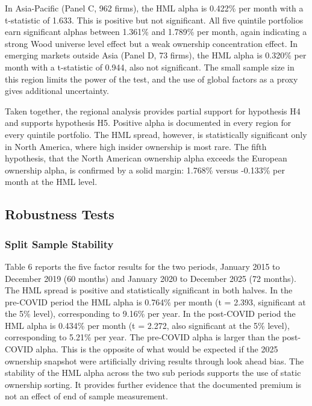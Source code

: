 In Asia-Pacific (Panel C, 962 firms), the HML alpha is 0.422\% per month with a t-statistic of 1.633. This is positive but not significant. All five quintile portfolios earn significant alphas between 1.361\% and 1.789\% per month, again indicating a strong Wood universe level effect but a weak ownership concentration effect. In emerging markets outside Asia (Panel D, 73 firms), the HML alpha is 0.320\% per month with a t-statistic of 0.944, also not significant. The small sample size in this region limits the power of the test, and the use of global factors as a proxy gives additional uncertainty.



Taken together, the regional analysis provides partial support for hypothesis H4 and supports hypothesis H5. Positive alpha is documented in every region for every quintile portfolio. The HML spread, however, is statistically significant only in North America, where high insider ownership is most rare. The fifth hypothesis, that the North American ownership alpha exceeds the European ownership alpha, is confirmed by a solid margin: 1.768\% versus -0.133\% per month at the HML level.


\subsection{Robustness Tests}


\subsubsection{Split Sample Stability}

Table 6 reports the five factor results for the two periods, January 2015 to December 2019 (60 months) and January 2020 to December 2025 (72 months). The HML spread is positive and statistically significant in both halves. In the pre-COVID period the HML alpha is 0.764\% per month (t = 2.393, significant at the 5\% level), corresponding to 9.16\% per year. In the post-COVID period the HML alpha is 0.434\% per month (t = 2.272, also significant at the 5\% level), corresponding to 5.21\% per year. The pre-COVID alpha is larger than the post-COVID alpha. This is the opposite of what would be expected if the 2025 ownership snapshot were artificially driving results through look ahead bias. The stability of the HML alpha across the two sub periods supports the use of static ownership sorting. It provides further evidence that the documented premium is not an effect of end of sample measurement.

